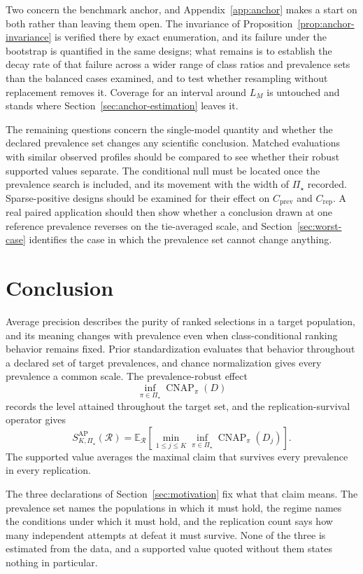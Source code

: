 \documentclass[11pt]{article}
\newcommand{\CNAP}{\operatorname{CNAP}}
\newcommand{\Regime}{\mathcal{R}}
\newcommand{\PSet}{\Pi_\star}
\newcommand{\E}{\mathbb{E}}
\theoremstyle{remark}
\begin{document}
Two concern the benchmark anchor, and Appendix~\ref{app:anchor} makes a start on both rather than leaving them open. The invariance of Proposition~\ref{prop:anchor-invariance} is verified there by exact enumeration, and its failure under the bootstrap is quantified in the same designs; what remains is to establish the decay rate of that failure across a wider range of class ratios and prevalence sets than the balanced cases examined, and to test whether resampling without replacement removes it. Coverage for an interval around $L_M$ is untouched and stands where Section~\ref{sec:anchor-estimation} leaves it.

The remaining questions concern the single-model quantity and whether the declared prevalence set changes any scientific conclusion. Matched evaluations with similar observed profiles should be compared to see whether their robust supported values separate. The conditional null must be located once the prevalence search is included, and its movement with the width of $\PSet$ recorded. Sparse-positive designs should be examined for their effect on $C_{\mathrm{prev}}$ and $C_{\mathrm{rep}}$. A real paired application should then show whether a conclusion drawn at one reference prevalence reverses on the tie-averaged scale, and Section~\ref{sec:worst-case} identifies the case in which the prevalence set cannot change anything.

\section{Conclusion}

Average precision describes the purity of ranked selections in a target population, and its meaning changes with prevalence even when class-conditional ranking behavior remains fixed. Prior standardization evaluates that behavior throughout a declared set of target prevalences, and chance normalization gives every prevalence a common scale. The prevalence-robust effect
\[
\inf_{\pi\in\PSet}\CNAP_\pi(D)
\]
records the level attained throughout the target set, and the replication-survival operator gives
\[
S_{K,\PSet}^{\mathrm{AP}}(\Regime)
=
\E_{\Regime}
\left[
\min_{1\leq j\leq K}
\inf_{\pi\in\PSet}
\CNAP_\pi(D_j)
\right].
\]
The supported value averages the maximal claim that survives every prevalence in every replication.

The three declarations of Section~\ref{sec:motivation} fix what that claim means. The prevalence set names the populations in which it must hold, the regime names the conditions under which it must hold, and the replication count says how many independent attempts at defeat it must survive. None of the three is estimated from the data, and a supported value quoted without them states nothing in particular.
\end{document}
